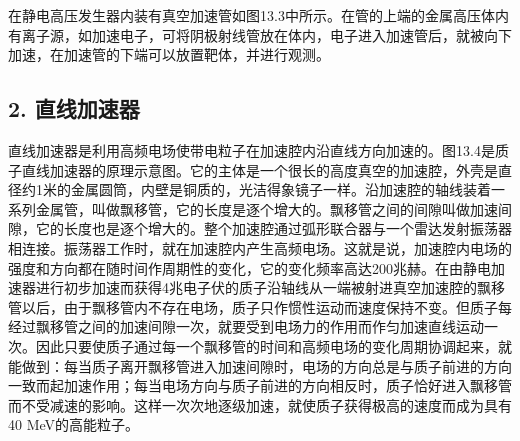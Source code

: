 在静电高压发生器内装有真空加速管如图13.3中所示。在管的上端的金属高压体内有离子源，如加速电子，可将阴极射线管放在体内，电子进入加速管后，就被向下加速，在加速管的下端可以放置靶体，并进行观测。

\subsection{2. 直线加速器}

直线加速器是利用高频电场使带电粒子在加速腔内沿直线方向加速的。图13.4是质子直线加速器的原理示意图。它的主体是一个很长的高度真空的加速腔，外壳是直径约1米的金属圆筒，内壁是铜质的，光洁得象镜子一样。沿加速腔的轴线装着一系列金属管，叫做飘移管，它的长度是逐个增大的。飘移管之间的间隙叫做加速间隙，它的长度也是逐个增大的。整个加速腔通过弧形联合器与一个雷达发射振荡器相连接。振荡器工作时，就在加速腔内产生高频电场。这就是说，加速腔内电场的强度和方向都在随时间作周期性的变化，它的变化频率高达200兆赫。在由静电加速器进行初步加速而获得4兆电子伏的质子沿轴线从一端被射进真空加速腔的飘移管以后，由于飘移管内不存在电场，质子只作惯性运动而速度保持不变。但质子每经过飘移管之间的加速间隙一次，就要受到电场力的作用而作匀加速直线运动一次。因此只要使质子通过每一个飘移管的时间和高频电场的变化周期协调起来，就能做到：每当质子离开飘移管进入加速间隙时，电场的方向总是与质子前进的方向一致而起加速作用；每当电场方向与质子前进的方向相反时，质子恰好进入飘移管而不受减速的影响。这样一次次地逐级加速，就使质子获得极高的速度而成为具有40
MeV的高能粒子。

